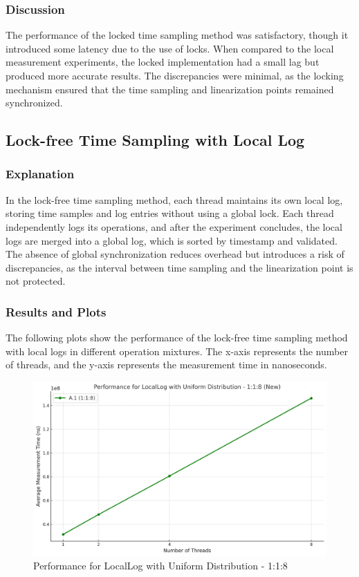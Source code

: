 \documentclass{article}
\begin{document}
\subsubsection{Discussion}
The performance of the locked time sampling method was satisfactory, though it introduced some latency due to the use of locks. When compared to the local measurement experiments, the locked implementation had a small lag but produced more accurate results. The discrepancies were minimal, as the locking mechanism ensured that the time sampling and linearization points remained synchronized.


\newpage
\subsection{Lock-free Time Sampling with Local Log}

\subsubsection{Explanation}
In the lock-free time sampling method, each thread maintains its own local log, storing time samples and log entries without using a global lock. Each thread independently logs its operations, and after the experiment concludes, the local logs are merged into a global log, which is sorted by timestamp and validated. The absence of global synchronization reduces overhead but introduces a risk of discrepancies, as the interval between time sampling and the linearization point is not protected.

\subsubsection{Results and Plots}

The following plots show the performance of the lock-free time sampling method with local logs in different operation mixtures. The x-axis represents the number of threads, and the y-axis represents the measurement time in nanoseconds.

\begin{figure}[H]
    \centering
    \includegraphics[width=\textwidth]{LaTex/images/Lab 3 2.4.2.1.png}
    \caption{Performance for LocalLog with Uniform Distribution - 1:1:8}
    \label{fig:performance_a1}
\end{figure}
\end{document}
